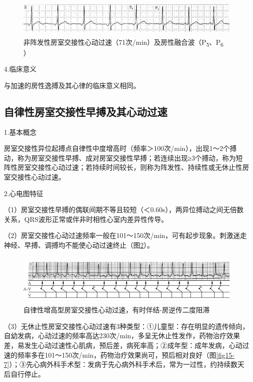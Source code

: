 \begin{figure}[!htbp]
 \centering
 \includegraphics[width=5.58333in,height=0.73958in]{./images/Image00271.jpg}
 \captionsetup{justification=centering}
 \caption{非阵发性房室交接性心动过速（71次/min）及房性融合波（P\textsubscript{5}、P\textsubscript{6} ）}
 \label{fig15-5}
  \end{figure} 


4.临床意义

与加速的房性逸搏及其心律的临床意义相同。

\protect\hypertarget{text00022.htmlux5cux23subid269}{}{}

\subsection{自律性房室交接性早搏及其心动过速}

1.基本概念

房室交接性异位起搏点自律性中度增高时（频率＞100次/min），出现1～2个搏动，称为房室交接性早搏、成对房室交接性早搏；若连续出现≥3个搏动，称为短阵性房室交接性心动过速；若持续时间较长，则称为阵发性、持续性或无休止性房室交接性心动过速。

2.心电图特征

（1）房室交接性早搏的偶联间期不等且较短（＜0.60s），两异位搏动之间无倍数关系，QRS波形正常或伴非时相性心室内差异性传导。

（2）房室交接性心动过速频率一般在101～150次/min，可有起步现象。刺激迷走神经、早搏、调搏均不能使心动过速终止（图\ref{fig15-6}）。

\begin{figure}[!htbp]
 \centering
 \includegraphics[width=5.72917in,height=0.98958in]{./images/Image00272.jpg}
 \captionsetup{justification=centering}
 \caption{自律性增高型房室交接性心动过速，有时伴结-房逆传二度阻滞}
 \label{fig15-6}
  \end{figure} 

（3）无休止性房室交接性心动过速有3种类型：①儿童型：存在明显的遗传倾向，自幼发病，心动过速的频率高达230次/min，多呈无休止性发作，药物治疗效果差，易发生心动过速性心肌病，预后差，病死率高；②成年型：成年发病，心动过速的频率多在101～150次/min，药物治疗效果尚可，预后相对良好（图\ref{fig15-7}）；③先心病外科手术型：发病于先心病外科手术后，常为一过性，约持续数天后自行停止。

